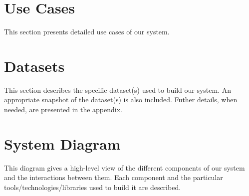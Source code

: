 \section{Use Cases}
This section presents detailed use cases of our system.

\section{Datasets}
This section describes the specific dataset(s) used to build our system. An appropriate snapshot of the dataset(s) is also included. Futher details, when needed, are presented in the appendix.

\section{System Diagram}
This diagram gives a high-level view of the different components of our system and the interactions between them. Each component and the particular tools/technologies/libraries used to build it are described.